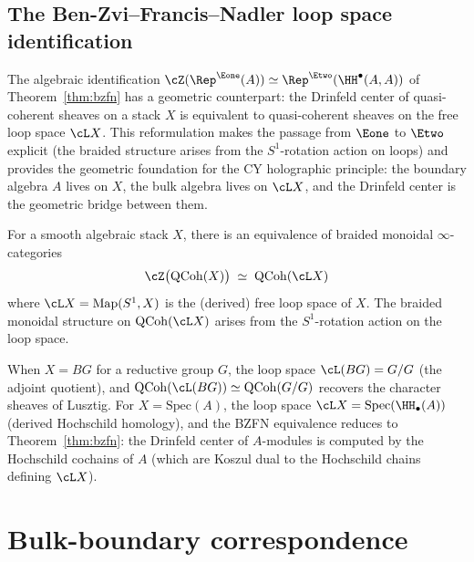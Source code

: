 \subsection{The Ben-Zvi--Francis--Nadler loop space identification}
\label{subsec:bzfn-loop-space}

The algebraic identification $\cZ(\Rep^{\Eone}(A)) \simeq \Rep^{\Etwo}(\HH^\bullet(A,A))$ of Theorem~\ref{thm:bzfn} has a geometric counterpart: the Drinfeld center of quasi-coherent sheaves on a stack $X$ is equivalent to quasi-coherent sheaves on the free loop space $\cL X$. This reformulation makes the passage from $\Eone$ to $\Etwo$ explicit (the braided structure arises from the $S^1$-rotation action on loops) and provides the geometric foundation for the CY holographic principle: the boundary algebra $A$ lives on $X$, the bulk algebra lives on $\cL X$, and the Drinfeld center is the geometric bridge between them.

\begin{theorem}
\label{thm:bzfn-loop-space}
For a smooth algebraic stack $X$, there is an equivalence
of braided monoidal $\infty$-categories
\[
 \cZ\bigl(\mathrm{QCoh}(X)\bigr) \;\simeq\; \mathrm{QCoh}(\cL X)
\]
where $\cL X = \mathrm{Map}(S^1, X)$ is the (derived) free loop
space of $X$. The braided monoidal structure on
$\mathrm{QCoh}(\cL X)$ arises from the $S^1$-rotation action on the
loop space.
\end{theorem}

\begin{remark}
\label{rem:bzfn-loop-center}
When $X = BG$ for a reductive group $G$, the loop space
$\cL(BG) = G/G$ (the adjoint quotient), and
$\mathrm{QCoh}(\cL(BG)) \simeq \mathrm{QCoh}(G/G)$ recovers
the character sheaves of Lusztig. For $X = \mathrm{Spec}(A)$,
the loop space $\cL X = \mathrm{Spec}(\HH_\bullet(A))$
(derived Hochschild homology), and the BZFN equivalence reduces
to Theorem~\ref{thm:bzfn}: the Drinfeld center of $A$-modules
is computed by the Hochschild cochains of $A$ (which are
Koszul dual to the Hochschild chains defining $\cL X$).
\end{remark}


\section{Bulk-boundary correspondence}
\label{sec:bulk-boundary}

